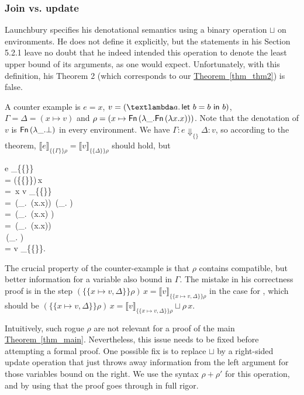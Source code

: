 \documentclass{jfp1}
\newcommand{\myref}[2]{\hyperref[#2]{#1~\ref*{#2}}}
\theoremstyle{nonumberbreak}
\newcommand{\sFn}[1]{\text{\textsf{Fn}}\,(#1)}
\newcommand{\keyword}[1]{\text{\textsf{#1}}}
\newcommand{\sLam}[2]{\text{\textlambda} #1.\, #2}
\newcommand{\sLet}[2]{\keyword{let}~#1~\keyword{in}~#2}
\newcommand{\sred}[5]{#1 : #2 \Downarrow_{#3} #4 : #5}
\newcommand{\sRule}[1]{\text{{\textsc{#1}}}}
\newcommand{\dsem}[2]{\llbracket #1 \rrbracket_{#2}}
\newcommand{\esem}[1]{\{\!\!\!\{#1\}\!\!\!\}}
\newcommand{\upd}[1]{\mathop{++_{#1}}}
\begin{document}
\subsubsection{Join vs. update}

Launchbury specifies his denotational semantics using a binary operation $\sqcup$ on environments. He does not define it explicitly, but the statements in his Section 5.2.1 leave no doubt that he indeed intended this operation to denote the least upper bound of its arguments, as one would expect. Unfortunately, with this definition, his Theorem 2 (which corresponds to our \myref{Theorem}{thm_thm2}) is false.

A counter example is $e = x$, $v = (\sLam{a}{\sLet{b = b}b})$, $\Gamma = \Delta = (x \mapsto v)$ and $\rho = (x \mapsto \sFn{\lambda \_. \sFn{\lambda x.x}})$. Note that the denotation of $v$ is $\sFn{\lambda \_. \bot}$ in every environment. We have $\sred\Gamma e{\{\}}\Delta v$, so according to the theorem, $\dsem{e}{\esem{\Gamma}{\rho}} = \dsem{v}{\esem{\Delta}{\rho}}$ should hold, but
\begin{conteq}
\dsem{e}{\esem\Gamma\rho} \\
= \big(\esem \Gamma\rho\big)\,x \\
= \rho\,x \sqcup \dsem{v}{\esem{\Gamma}\rho} \\
= \sFn{\lambda \_. \sFn{\lambda x.x}} \sqcup \sFn{\lambda \_. \bot} \\
= \sFn{\lambda \_. \sFn{\lambda x.x} \sqcup \bot} \\
= \sFn{\lambda \_. \sFn{\lambda x.x}} \\
\ne \sFn{\lambda \_. \bot} \\
= \dsem{v}{\esem{\Delta}{\rho}}.
\end{conteq}



The crucial property of the counter-example is that $\rho$ contains compatible, but better information for a variable also bound in $\Gamma$.
%
The mistake in his correctness proof is in the step $(\esem{x \mapsto v, \Delta}\rho)\,x = \dsem{v}{\esem{x \mapsto v, \Delta}\rho}$ in the case for \sRule{Var}, which should be $(\esem{x \mapsto v, \Delta}\rho)\,x = \dsem{v}{\esem{x \mapsto v, \Delta}\rho} \sqcup \rho\,x$.

Intuitively, such rogue $\rho$ are not relevant for a proof of the main \myref{Theorem}{thm_main}. Nevertheless, this issue needs to be fixed before attempting a formal proof. One possible fix is to replace $\sqcup$ by a right-sided update operation that just throws away information from the left argument for those variables bound on the right. We use the syntax $\rho \upd S \rho'$ for this operation, and by using that the proof goes through in full rigor.
\end{document}
